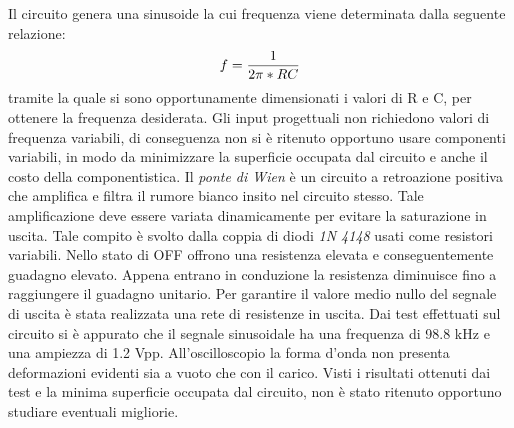 \documentclass[12pt,a4paper,oneside,openright,italian]{article}
\begin{document}
Il circuito genera una sinusoide la cui frequenza viene determinata dalla seguente relazione:
\begin{equation} 
f = {1 \over 2\pi*RC}
\end{equation}
tramite la quale si sono opportunamente dimensionati i valori di R e C, per ottenere la frequenza desiderata. Gli input progettuali non richiedono valori di frequenza variabili, di conseguenza non si \`e ritenuto opportuno usare componenti variabili, in modo da minimizzare la superficie occupata dal circuito e anche il costo della componentistica.
Il \emph{ponte di Wien} \`e un circuito a retroazione positiva che amplifica e filtra il rumore bianco insito nel circuito stesso. Tale amplificazione deve essere variata dinamicamente per evitare la saturazione in uscita. Tale compito \`e svolto dalla coppia di diodi \emph{1N 4148} usati come resistori variabili. Nello stato di OFF offrono una resistenza elevata e conseguentemente guadagno elevato. Appena entrano in conduzione la resistenza diminuisce fino a raggiungere il guadagno unitario.
Per garantire il valore medio nullo del segnale di uscita \`e stata realizzata una rete di resistenze in uscita. Dai test effettuati sul circuito si \`e appurato che il segnale sinusoidale ha una frequenza di 98.8 kHz e una ampiezza di 1.2 Vpp. All'oscilloscopio la forma d'onda non presenta deformazioni evidenti sia a vuoto che con il carico. Visti i risultati ottenuti dai test e la minima superficie occupata dal circuito, non \`e stato ritenuto opportuno studiare eventuali migliorie.
\end{document}
